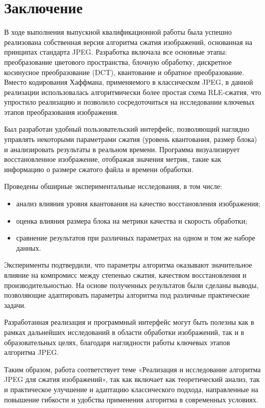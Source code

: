 \section*{Заключение}

В ходе выполнения выпускной квалификационной работы была успешно реализована собственная версия алгоритма 
сжатия изображений, основанная на принципах стандарта JPEG. 
Разработка включала все основные этапы: преобразование цветового пространства, 
блочную обработку, дискретное косинусное преобразование (DCT), квантование и обратное преобразование. 
Вместо кодирования Хаффмана, применяемого в классическом JPEG, 
в данной реализации использовалась алгоритмически более простая схема RLE-сжатия, 
что упростило реализацию и позволило сосредоточиться на исследовании ключевых этапов преобразования изображения.

Был разработан удобный пользовательский интерфейс, позволяющий наглядно управлять некоторыми параметрами 
сжатия (уровень квантования, размер блока) и анализировать результаты в реальном времени. 
Программа визуализирует восстановленное изображение, отображая значения метрик, 
такие как информацию о размере сжатого файла и времени обработки.

Проведены обширные экспериментальные исследования, в том числе:

\begin{itemize}
    \item анализ влияния уровня квантования на качество восстановления изображения;
    \item оценка влияния размера блока на метрики качества и скорость обработки;
    \item сравнение результатов при различных параметрах на одном и том же наборе данных.
\end{itemize}

Эксперименты подтвердили, что параметры алгоритма оказывают значительное влияние 
на компромисс между степенью сжатия, качеством восстановления и производительностью. 
На основе полученных результатов были сделаны выводы, позволяющие адаптировать параметры алгоритма 
под различные практические задачи.

Разработанная реализация и программный интерфейс могут быть полезны как в рамках дальнейших исследований 
в области обработки изображений, так и в образовательных целях, 
благодаря наглядности работы ключевых этапов алгоритма JPEG.

Таким образом, работа соответствует теме «Реализация и исследование алгоритма JPEG для сжатия изображений», 
так как включает как теоретический анализ, так и практическое улучшение и адаптацию классического подхода, 
направленные на повышение гибкости и удобства применения алгоритма в современных условиях.